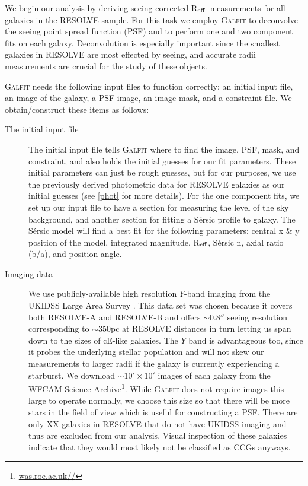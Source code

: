 \documentclass[iop,apj]{emulateapj}
\newcommand{\Reff}{R$_{\rm eff}$}
\begin{document}
\noindent We begin our analysis by deriving seeing-corrected \Reff\ measurements for all galaxies in the RESOLVE sample. For this task we employ \textsc{Galfit} \citep{Peng2002} to deconvolve the seeing point spread function (PSF) and to perform one and two component fits on each galaxy. Deconvolution is especially important since the smallest galaxies in RESOLVE are most effected by seeing, and accurate radii measurements are crucial for the study of these objects. 

\textsc{Galfit} needs the following input files to function correctly: an initial input file, an image of the galaxy, a PSF image, an image mask, and a constraint file. We obtain/construct these items as follows:

\begin{description}

\item[The initial input file]{The initial input file tells \textsc{Galfit} where to find the image, PSF, mask, and constraint, and also holds the initial guesses for our fit parameters. These initial parameters can just be rough guesses, but for our purposes, we use the previously derived photometric data for RESOLVE galaxies as our initial guesses (see \autoref{phot} for more details). For the one component fits, we set up our input file to have a section for measuring the level of the sky background, and another section for fitting a S\'ersic profile to galaxy. The S\'ersic model will find a best fit for the following parameters: central x \& y position of the model, integrated magnitude, \Reff, S\'ersic n, axial ratio (b/a), and position angle.}

\item[Imaging data]{We use publicly-available high resolution $Y$-band imaging from the UKIDSS Large Area Survey \citep{Lawrence2007}. This data set was chosen because it covers both RESOLVE-A and RESOLVE-B and offers $\sim0.8''$ seeing resolution corresponding to $\sim350$pc at RESOLVE distances in turn letting us span down to the sizes of cE-like galaxies. The $Y$ band is advantageous too, since it probes the underlying stellar population and will not skew our measurements to larger radii if the galaxy is currently experiencing a starburst. We download $\sim10'\times10'$ images of each galaxy from the WFCAM Science Archive\footnote{\url{was.roe.ac.uk//}}}. While \textsc{Galfit} does not require images this large to operate normally, we choose this size so that there will be more stars in the field of view which is useful for constructing a PSF. There are  only XX galaxies in RESOLVE that do not have UKIDSS imaging and thus are excluded from our analysis. Visual inspection of these galaxies indicate that they would most likely not be classified as CCGs anyways.


\end{description}
\end{document}
